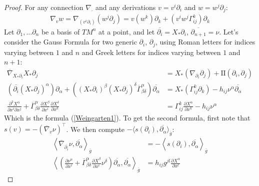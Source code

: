 \begin{proof}
	For any connection $\nabla_\cdot$ and any derivations $v=v^i \partial_i$ and $w=w^j \partial_j$:
	\begin{align*}
		\nabla_{v} w = \nabla_{(v^i \partial_i)} (w^j \partial_j) = v(w^k)\partial_k + (v^i w^j \Gamma^{k}_{ij})\partial_k
	\end{align*}
	Let $\partial_1, \dots \partial_n$ be a basis of $TM^n$ at a point, and let $\overline{\partial_i} = X_*\partial_i$, $\overline{\partial_{n+1}}=\nu$.
	Let's consider the Gauss Formula for two generic $\partial_i$, $\partial_j$, using Roman letters for indices varying between $1$ and $n$ and Greek letters for indices varying between $1$ and $n+1$:%
	\begin{align*}
		\overline{\nabla}_{X_*\partial_i} X_* \partial_j &= X_* (\nabla_{\partial_i} \partial_j)  + \mathrm{I\!I} (\partial_i, \partial_j) \\
		(\overline{\partial_i}(X_*\partial_j)^\alpha) \partial_\alpha + ((X_*\partial_i)^\beta (X_*\partial_j)^\delta \overline{ \Gamma}^{\alpha}_{\beta \delta})\overline{\partial_\alpha} &= X_* (\Gamma^{k}_{ij}\partial_k)  - h_{ij}\nu^\alpha \overline{\partial_\alpha}\\
		\frac{\partial^2 X^\alpha}{\partial x^i \partial x^j} +\overline{\Gamma}^\alpha_{\beta \delta}\frac{\partial X^\beta}{\partial x^i}\frac{\partial X^\delta}{\partial x^k}&=\Gamma^k_{ij}\frac{\partial X^\alpha}{\partial x^k}-h_{ij}\nu^\alpha
	\end{align*}
	Which is the formula (\ref{Weingarten1}). 
	To get the second formula, first note that $s(v) = -(\overline{\nabla}_v \nu)^\top$. We then compute $-\langle s(\partial_i), \overline{\partial_\alpha}\rangle_{\overline{g}}$:
	\begin{align*}
		\left\langle\overline{\nabla}_{\overline{\partial_i}} \nu, \overline{\partial_\alpha}\right\rangle_{\overline{g}} &= -\left\langle s(\partial_i), \overline{\partial_\alpha}\right\rangle_{\overline{g}}\\
		\left\langle \left(\frac{\partial \nu^\alpha}{\partial x^i}+\overline{\Gamma}^\alpha_{\beta \delta}\frac{\partial X^\beta}{\partial x^i} \nu^\delta \right)\overline{\partial_\alpha}, \overline{\partial_\alpha} \right\rangle_{\overline{g}}&= h_{ij}g^{jl}\frac{\partial X^\alpha}{\partial x^l}

\end{align*}
\end{proof}
